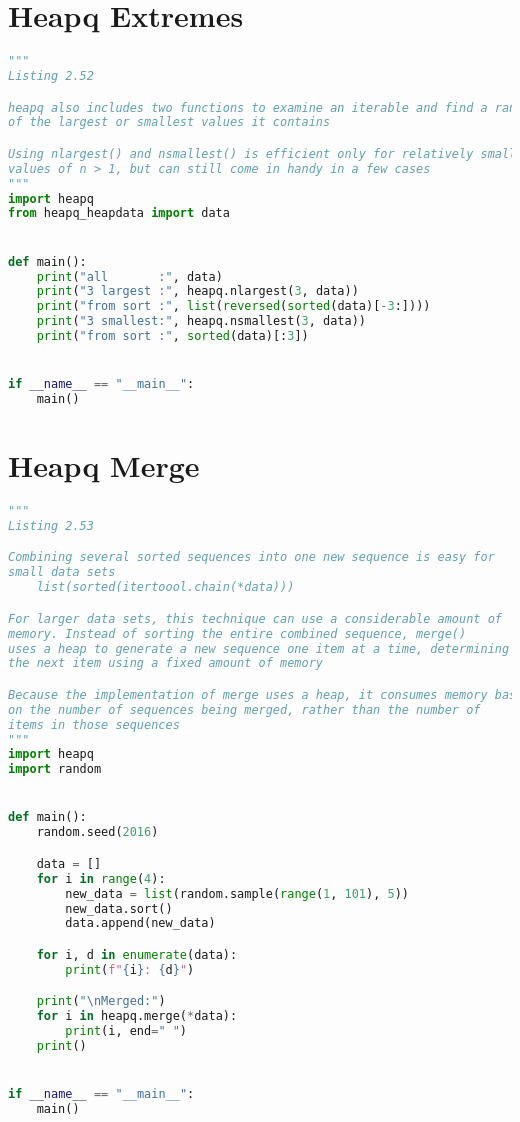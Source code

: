 \documentclass[a4paper,landscape]{report}
\begin{document}
\section{Heapq Extremes}
\begin{lstlisting}[language=Python]
"""
Listing 2.52

heapq also includes two functions to examine an iterable and find a range
of the largest or smallest values it contains

Using nlargest() and nsmallest() is efficient only for relatively small
values of n > 1, but can still come in handy in a few cases
"""
import heapq
from heapq_heapdata import data


def main():
    print("all       :", data)
    print("3 largest :", heapq.nlargest(3, data))
    print("from sort :", list(reversed(sorted(data)[-3:])))
    print("3 smallest:", heapq.nsmallest(3, data))
    print("from sort :", sorted(data)[:3])


if __name__ == "__main__":
    main()

\end{lstlisting}
\section{Heapq Merge}
\begin{lstlisting}[language=Python]
"""
Listing 2.53

Combining several sorted sequences into one new sequence is easy for
small data sets
    list(sorted(itertoool.chain(*data)))

For larger data sets, this technique can use a considerable amount of
memory. Instead of sorting the entire combined sequence, merge()
uses a heap to generate a new sequence one item at a time, determining
the next item using a fixed amount of memory

Because the implementation of merge uses a heap, it consumes memory based
on the number of sequences being merged, rather than the number of
items in those sequences
"""
import heapq
import random


def main():
    random.seed(2016)

    data = []
    for i in range(4):
        new_data = list(random.sample(range(1, 101), 5))
        new_data.sort()
        data.append(new_data)

    for i, d in enumerate(data):
        print(f"{i}: {d}")

    print("\nMerged:")
    for i in heapq.merge(*data):
        print(i, end=" ")
    print()


if __name__ == "__main__":
    main()

\end{lstlisting}
\end{document}
